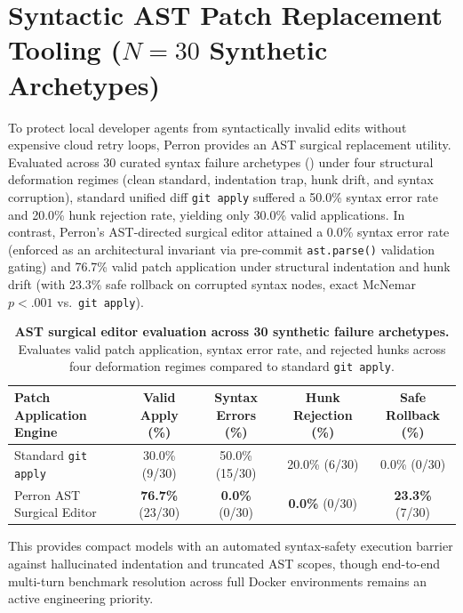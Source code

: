 \documentclass[10pt]{article}
\begin{document}
\section{Syntactic AST Patch Replacement Tooling (\texorpdfstring{$N=30$}{N=30} Synthetic Archetypes)}
\label{app:ast_editor}

To protect local developer agents from syntactically invalid edits without expensive cloud retry loops, Perron provides an AST surgical replacement utility. Evaluated across 30 curated syntax failure archetypes () under four structural deformation regimes (clean standard, indentation trap, hunk drift, and syntax corruption), standard unified diff \texttt{git apply} suffered a 50.0\% syntax error rate and 20.0\% hunk rejection rate, yielding only 30.0\% valid applications. In contrast, Perron's AST-directed surgical editor attained a 0.0\% syntax error rate (enforced as an architectural invariant via pre-commit \texttt{ast.parse()} validation gating) and 76.7\% valid patch application under structural indentation and hunk drift (with 23.3\% safe rollback on corrupted syntax nodes, exact McNemar $p < .001$ vs.\ \texttt{git apply}).

\begin{table}[!htbp]
\centering
\footnotesize
\setlength{\tabcolsep}{4.0pt}
\caption{\textbf{AST surgical editor evaluation across 30 synthetic failure archetypes.} Evaluates valid patch application, syntax error rate, and rejected hunks across four deformation regimes compared to standard \texttt{git apply}.}
\label{tab:ast_editor_benchmarks}
\begin{tabular}{lcccc}
\toprule
\textbf{Patch Application Engine} & \textbf{Valid Apply (\%)} & \textbf{Syntax Errors (\%)} & \textbf{Hunk Rejection (\%)} & \textbf{Safe Rollback (\%)} \\
\midrule
Standard \texttt{git apply} & 30.0\% (9/30) & 50.0\% (15/30) & 20.0\% (6/30) & 0.0\% (0/30) \\
Perron AST Surgical Editor & \textbf{76.7\%} (23/30) & \textbf{0.0\%} (0/30) & \textbf{0.0\%} (0/30) & \textbf{23.3\%} (7/30) \\
\bottomrule
\end{tabular}
\end{table}

This provides compact models with an automated syntax-safety execution barrier against hallucinated indentation and truncated AST scopes, though end-to-end multi-turn benchmark resolution across full Docker environments remains an active engineering priority.
\end{document}
